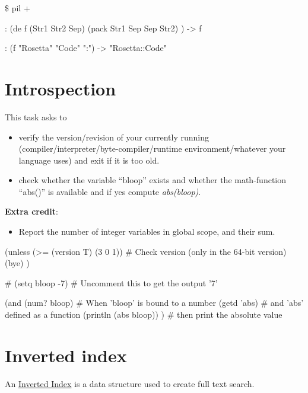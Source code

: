 \begin{wideverbatim}

\$ pil +

: (de f (Str1 Str2 Sep)
   (pack Str1 Sep Sep Str2) )
-> f

: (f "Rosetta" "Code" ":")
-> "Rosetta::Code"

\end{wideverbatim}

\pagebreak{}
\section*{Introspection}

This task asks to

\begin{itemize}
\item
  verify the version/revision of your currently running
  (compiler/interpreter/byte-compiler/runtime environment/whatever your
  language uses) and exit if it is too old.
\item
  check whether the variable ``bloop'' exists and whether the
  math-function ``abs()'' is available and if yes compute
  \emph{abs(bloop)}.
\end{itemize}

\textbf{Extra credit}:

\begin{itemize}
\item
  Report the number of integer variables in global scope, and their sum.
\end{itemize}


\begin{wideverbatim}

(unless (>= (version T) (3 0 1))       # Check version (only in the 64-bit version)
   (bye) )

# (setq bloop -7)                      # Uncomment this to get the output '7'

(and
   (num? bloop)                        # When 'bloop' is bound to a number
   (getd 'abs)                         # and 'abs' defined as a function
   (println (abs bloop)) )             # then print the absolute value

\end{wideverbatim}

\pagebreak{}
\section*{Inverted index}

An \href{http://en.wikipedia.org/wiki/Inverted\_index}{Inverted Index}
is a data structure used to create full text search.

